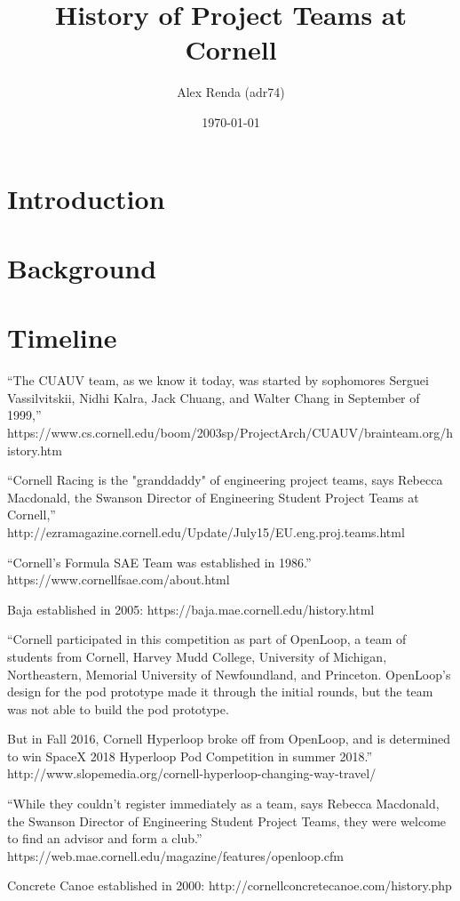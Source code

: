 \documentclass[12pt]{article}
\title{History of Project Teams at Cornell}
\author{Alex Renda (adr74)}
\date{\monthyeardate\today}
\begin{document}
\maketitle

\section{Introduction}

\section{Background}

\section{Timeline}

``The CUAUV team, as we know it today, was started by sophomores Serguei Vassilvitskii, Nidhi Kalra, Jack Chuang, and Walter Chang in September of 1999,''
https://www.cs.cornell.edu/boom/2003sp/ProjectArch/CUAUV/brainteam.org/history.htm

``Cornell Racing is the "granddaddy" of engineering project teams, says Rebecca Macdonald, the Swanson Director of Engineering Student Project Teams at Cornell,''  http://ezramagazine.cornell.edu/Update/July15/EU.eng.proj.teams.html

``Cornell’s Formula SAE Team was established in 1986.''
https://www.cornellfsae.com/about.html

Baja established in 2005:
https://baja.mae.cornell.edu/history.html

``Cornell participated in this competition as part of OpenLoop, a team of students from Cornell, Harvey Mudd College, University of Michigan, Northeastern, Memorial University of Newfoundland, and Princeton.  OpenLoop’s design for the pod prototype made it through the initial rounds, but the team was not able to build the pod prototype.

But in Fall 2016, Cornell Hyperloop broke off from OpenLoop, and is determined to win SpaceX 2018 Hyperloop Pod Competition in summer 2018.''
http://www.slopemedia.org/cornell-hyperloop-changing-way-travel/

``While they couldn’t register immediately as a team, says Rebecca Macdonald, the Swanson Director of Engineering Student Project Teams, they were welcome to find an advisor and form a club.''
https://web.mae.cornell.edu/magazine/features/openloop.cfm


Concrete Canoe established in 2000:
http://cornellconcretecanoe.com/history.php
\end{document}

